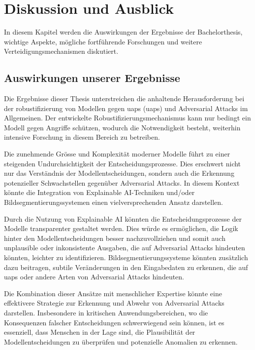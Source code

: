 \section{Diskussion und Ausblick} \label{chap:Diskussion und Ausblick}
In diesem Kapitel werden die Auswirkungen der Ergebnisse der Bachelorthesis, wichtige Aspekte, mögliche fortführende Forschungen und weitere Verteidigungsmechanismen diskutiert. 

\subsection{Auswirkungen unserer Ergebnisse}

Die Ergebnisse dieser Thesis unterstreichen die anhaltende Herausforderung bei der \Gls{robustifizierung} von Modellen gegen \acrlong{uap}s (\acrshort{uap}s) und Adversarial Attacks im Allgemeinen. Der entwickelte Robustifizierungsmechanismus kann nur bedingt ein Modell gegen Angriffe schützen, wodurch die Notwendigkeit besteht, weiterhin intensive Forschung in diesem Bereich zu betreiben.

Die zunehmende Grösse und Komplexität moderner Modelle führt zu einer steigenden Undurchsichtigkeit der Entscheidungsprozesse. Dies erschwert nicht nur das Verständnis der Modellentscheidungen, sondern auch die Erkennung potenzieller Schwachstellen gegenüber Adversarial Attacks. In diesem Kontext könnte die Integration von Explainable AI-Techniken und/oder Bildsegmentierungssystemen einen vielversprechenden Ansatz darstellen.

Durch die Nutzung von Explainable AI könnten die Entscheidungsprozesse der Modelle transparenter gestaltet werden. Dies würde es ermöglichen, die Logik hinter den Modellentscheidungen besser nachzuvollziehen und somit auch unplausible oder inkonsistente Ausgaben, die auf Adversarial Attacks hindeuten könnten, leichter zu identifizieren. Bildsegmentierungssysteme könnten zusätzlich dazu beitragen, subtile Veränderungen in den Eingabedaten zu erkennen, die auf \acrshort{uap}s oder andere Arten von Adversarial Attacks hindeuten.

Die Kombination dieser Ansätze mit menschlicher Expertise könnte eine effektivere Strategie zur Erkennung und Abwehr von Adversarial Attacks darstellen. Insbesondere in kritischen Anwendungsbereichen, wo die Konsequenzen falscher Entscheidungen schwerwiegend sein können, ist es essenziell, dass Menschen in der Lage sind, die Plausibilität der Modellentscheidungen zu überprüfen und potenzielle Anomalien zu erkennen.

